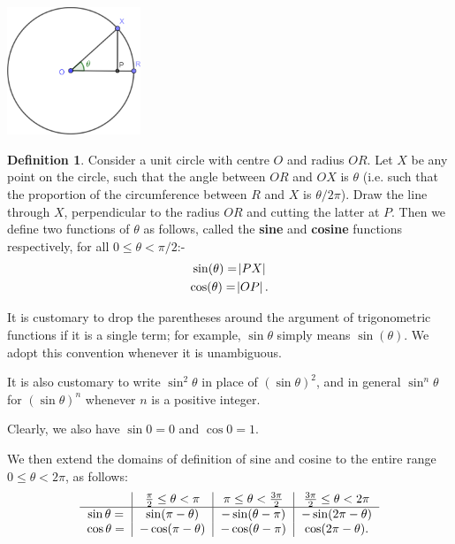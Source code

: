 \documentclass[a4paper,leqno]{article}
\numberwithin{equation}{section}
\theoremstyle{definition}
\newtheorem{defn}[equation]{Definition}
\theoremstyle{remark}
\newcommand{\df}[1]{\textbf{#1}}
\begin{document}
\begin{center}
  \includegraphics[width=0.3\textwidth]{fndefinitions}
\end{center}

\begin{defn}\label{defn:trig1}
  Consider a unit circle with centre $ O $ and radius $ OR $. Let $ X $ be any point on the circle, such that the angle between $ OR $ and $ OX $
  is $ \theta $ (i.e. such that the proportion of the circumference between $ R $ and $ X $ is $ \theta/2\pi $). Draw the line through $ X $,
  perpendicular to the radius $ OR $ and cutting the latter at $ P $. Then we define two functions of $ \theta $ as follows, called the \df{sine} and \df{cosine}
  functions respectively, for all $ 0 \leq \theta < \pi/2 $:-
  \begin{gather}
    \sin(\theta) = \abs{PX}\\
    \cos(\theta) = \abs{OP}.
  \end{gather}
\end{defn}

It is customary to drop the parentheses around the argument of trigonometric functions if it is a single term; for
example, $ \sin \theta $ simply means $ \sin(\theta) $. We adopt this convention whenever it is unambiguous.

It is also customary to write $ \sin^2 \theta $ in place of $ (\sin \theta)^2 $, and in general $ \sin^n \theta $
for $ (\sin \theta)^n $ whenever $ n $ is a positive integer.

Clearly, we also have $ \sin 0 = 0 $ and $ \cos 0 = 1 $.

We then extend the domains of definition of sine and cosine to the entire range $ 0 \leq \theta < 2\pi $, as follows:
\begin{equation}\label{tab:extend1}
\begin{tabular}{c|c|c|c}
  & $ \frac{\pi}{2} \leq \theta < \pi $ & $ \pi \leq \theta < \frac{3\pi}{2} $ & $ \frac{3\pi}{2} \leq \theta < 2\pi $\\\hline
  $ \sin \theta = $ & $ \sin(\pi - \theta) $ & $ -\sin(\theta - \pi)$ & $-\sin(2\pi - \theta) $\\
  $ \cos \theta = $ & $ -\cos(\pi - \theta) $ & $ - \cos (\theta - \pi) $ & $ \cos(2\pi - \theta) $.
\end{tabular}
\end{equation}
\end{document}
